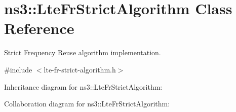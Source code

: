 \hypertarget{classns3_1_1LteFrStrictAlgorithm}{}\section{ns3\+:\+:Lte\+Fr\+Strict\+Algorithm Class Reference}
\label{classns3_1_1LteFrStrictAlgorithm}


Strict Frequency Reuse algorithm implementation.  




{\ttfamily \#include $<$lte-\/fr-\/strict-\/algorithm.\+h$>$}



Inheritance diagram for ns3\+:\+:Lte\+Fr\+Strict\+Algorithm\+:


Collaboration diagram for ns3\+:\+:Lte\+Fr\+Strict\+Algorithm\+:
